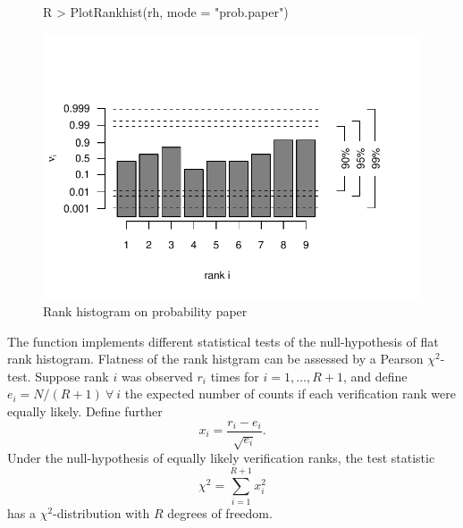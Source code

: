 \documentclass[article]{jss}
\begin{document}
\begin{figure}
\begin{center}
%
\begin{Schunk}
\begin{Sinput}
R > PlotRankhist(rh, mode = "prob.paper")
\end{Sinput}
\end{Schunk}
\includegraphics{fig-rank-hist-pp}
%
\end{center}
\caption{Rank histogram on probability paper}
\label{fig:rank-hist-pp}
\end{figure}


The function  implements different statistical tests of the null-hypothesis of flat rank histogram.
Flatness of the rank histgram can be assessed by a Pearson $\chi^2$-test.
Suppose rank $i$ was observed $r_i$ times for $i=1,\dots,R+1$, and define $e_i=N/(R+1)\ \forall\ i$ the expected number of counts if each verification rank were equally likely.
Define further
\begin{equation}
x_i = \frac{r_i - e_i}{\sqrt{e_i}}.
\end{equation}
%
Under the null-hypothesis of equally likely verification ranks, the test statistic
%
\begin{equation}
\chi^2 = \sum_{i=1}^{R+1} x_i^2
\end{equation}
%
has a $\chi^2$-distribution with $R$ degrees of freedom.
\end{document}
